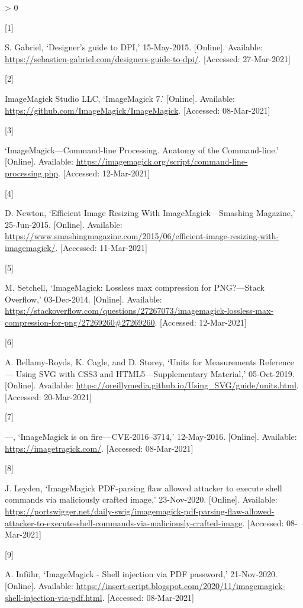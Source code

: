 \documentclass[
  11pt,
  british,
  a4paper,
]{article}
\newlength{\cslhangindent}
\newlength{\csllabelwidth}
\newenvironment{CSLReferences}[2] %
 {%
  \setlength{\parindent}{0pt}
  \ifodd #1 \everypar{\setlength{\hangindent}{\cslhangindent}}\ignorespaces\fi
  \ifnum #2 > 0
  \setlength{\parskip}{#2\baselineskip}
  \fi
 }%
 {}
\newcommand{\CSLLeftMargin}[1]{\parbox[t]{\csllabelwidth}{#1}}
\newcommand{\CSLRightInline}[1]{\parbox[t]{\linewidth - \csllabelwidth}{#1}\break}
\begin{document}
\hypertarget{refs}{}
\begin{CSLReferences}{0}{0}
\leavevmode\hypertarget{ref-gabriel2017}{}%
\CSLLeftMargin{{[}1{]} }
\CSLRightInline{S. Gabriel, {`{Designer's guide to DPI},'} 15-May-2015.
{[}Online{]}. Available:
\url{https://sebastien-gabriel.com/designers-guide-to-dpi/}.
{[}Accessed: 27-Mar-2021{]}}

\leavevmode\hypertarget{ref-imagemagicksource}{}%
\CSLLeftMargin{{[}2{]} }
\CSLRightInline{ImageMagick Studio LLC, {`ImageMagick 7.'} {[}Online{]}.
Available: \url{https://github.com/ImageMagick/ImageMagick}.
{[}Accessed: 08-Mar-2021{]}}

\leavevmode\hypertarget{ref-imcli}{}%
\CSLLeftMargin{{[}3{]} }
\CSLRightInline{{`{ImageMagick---Command-line Processing}. {Anatomy of
the Command-line}.'} {[}Online{]}. Available:
\url{https://imagemagick.org/script/command-line-processing.php}.
{[}Accessed: 12-Mar-2021{]}}

\leavevmode\hypertarget{ref-newton2015}{}%
\CSLLeftMargin{{[}4{]} }
\CSLRightInline{D. Newton, {`{Efficient Image Resizing With
ImageMagick---Smashing Magazine},'} 25-Jun-2015. {[}Online{]}.
Available:
\url{https://www.smashingmagazine.com/2015/06/efficient-image-resizing-with-imagemagick/}.
{[}Accessed: 11-Mar-2021{]}}

\leavevmode\hypertarget{ref-setchell2014}{}%
\CSLLeftMargin{{[}5{]} }
\CSLRightInline{M. Setchell, {`{ImageMagick: Lossless max compression
for PNG?---Stack Overflow},'} 03-Dec-2014. {[}Online{]}. Available:
\url{https://stackoverflow.com/questions/27267073/imagemagick-lossless-max-compression-for-png/27269260\#27269260}.
{[}Accessed: 12-Mar-2021{]}}

\leavevmode\hypertarget{ref-oreilly2019}{}%
\CSLLeftMargin{{[}6{]} }
\CSLRightInline{A. Bellamy-Royds, K. Cagle, and D. Storey, {`{Units for
Measurements Reference --- Using SVG with CSS3 and HTML5---Supplementary
Material},'} 05-Oct-2019. {[}Online{]}. Available:
\url{https://oreillymedia.github.io/Using_SVG/guide/units.html}.
{[}Accessed: 20-Mar-2021{]}}

\leavevmode\hypertarget{ref-imagetragick2016}{}%
\CSLLeftMargin{{[}7{]} }
\CSLRightInline{---, {`ImageMagick is on fire --- CVE-2016--3714,'}
12-May-2016. {[}Online{]}. Available: \url{https://imagetragick.com/}.
{[}Accessed: 08-Mar-2021{]}}

\leavevmode\hypertarget{ref-leyden2020}{}%
\CSLLeftMargin{{[}8{]} }
\CSLRightInline{J. Leyden, {`ImageMagick PDF-parsing flaw allowed
attacker to execute shell commands via maliciously crafted image,'}
23-Nov-2020. {[}Online{]}. Available:
\url{https://portswigger.net/daily-swig/imagemagick-pdf-parsing-flaw-allowed-attacker-to-execute-shell-commands-via-maliciously-crafted-image}.
{[}Accessed: 08-Mar-2021{]}}

\leavevmode\hypertarget{ref-infuhr2020}{}%
\CSLLeftMargin{{[}9{]} }
\CSLRightInline{A. Inführ, {`{ImageMagick - Shell injection via PDF
password},'} 21-Nov-2020. {[}Online{]}. Available:
\url{https://insert-script.blogspot.com/2020/11/imagemagick-shell-injection-via-pdf.html}.
{[}Accessed: 08-Mar-2021{]}}

\end{CSLReferences}
\end{document}
